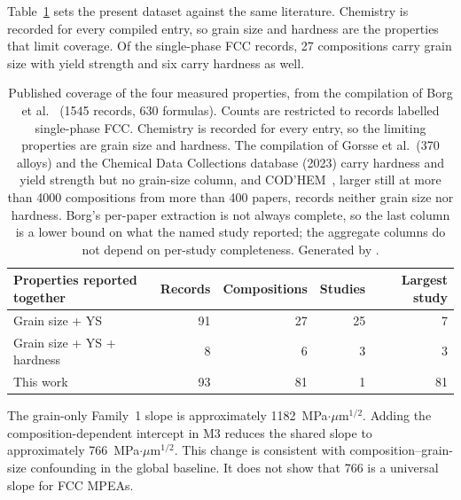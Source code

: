 \documentclass[a4paper,11pt]{article}
\begin{document}
Table~\ref{tab:litcoverage} sets the present dataset against the same literature. Chemistry is recorded for every compiled entry, so grain size and hardness are the properties that limit coverage. Of the single-phase FCC records, 27 compositions carry grain size with yield strength and six carry hardness as well.

\begin{table}[H]
\centering
\caption{Published coverage of the four measured properties, from the compilation of Borg et al.~\cite{Borg2020} (1545 records, 630 formulas). Counts are restricted to records labelled single-phase FCC. Chemistry is recorded for every entry, so the limiting properties are grain size and hardness. The compilation of Gorsse et al.\ (370 alloys) and the Chemical Data Collections database (2023) carry hardness and yield strength but no grain-size column, and COD'HEM~\cite{CODHEM2025}, larger still at more than 4000 compositions from more than 400 papers, records neither grain size nor hardness. Borg's per-paper extraction is not always complete, so the last column is a lower bound on what the named study reported; the aggregate columns do not depend on per-study completeness. Generated by \protect{}.}
\label{tab:litcoverage}
\small
\begin{tabular}{@{}lrrrr@{}}
\toprule
Properties reported together & Records & Compositions & Studies & Largest study \\
\midrule
Grain size + YS & 91 & 27 & 25 & 7 \\
Grain size + YS + hardness & 8 & 6 & 3 & 3 \\
\midrule
This work & 93 & 81 & 1 & 81 \\
\bottomrule
\end{tabular}
\end{table}

The grain-only Family~1 slope is approximately 1182~MPa$\cdot\mu$m$^{1/2}$. Adding the composition-dependent intercept in M3 reduces the shared slope to approximately 766~MPa$\cdot\mu$m$^{1/2}$. This change is consistent with composition--grain-size confounding in the global baseline. It does not show that 766 is a universal slope for FCC MPEAs.
\end{document}
